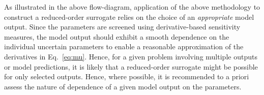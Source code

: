 As illustrated in the above flow-diagram, application of the above methodology to construct a reduced-order
surrogate relies on the choice of an \textit{appropriate} model output. Since the parameters are screened
using derivative-based sensitivity measures, the model output should exhibit a smooth dependence on the
individual uncertain parameters to enable a reasonable approximation of the derivatives in Eq.~\ref{eq:mu}.
Hence, for a given problem involving multiple outputs or model predictions, it is likely that a reduced-order 
surrogate might be possible for only selected outputs. Hence, where possible, it is recommended to a priori assess the
nature of dependence of a given model output on the parameters.





 
